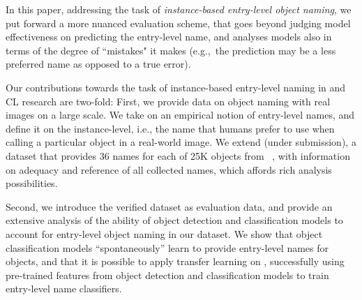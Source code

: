 In this paper, addressing the task of \textit{instance-based entry-level object naming}, we put forward a more nuanced evaluation scheme, that goes beyond judging model effectiveness on predicting the entry-level name, and analyses models also in terms of the degree of ``mistakes" it makes (e.g.,~the prediction may be a less preferred name as opposed to a true error).  

Our contributions towards the task of instance-based entry-level naming in \lv and CL research are two-fold:  
First, we provide data on object naming with real images on a large scale. 
We take on an empirical notion of entry-level names, and define it on the instance-level, i.e., the name that humans prefer to use when calling a particular object in a real-world image.   
We extend \mn (under submission), a dataset that provides 36 names for each of 25K objects from \vg~\cite{krishna2016visualgenome}, with information on adequacy and reference of all collected names, which affords rich analysis possibilities. 

Second, we introduce the verified \mn dataset as evaluation data, and provide an extensive analysis of the ability of object detection and classification models to account for entry-level object naming in our dataset. 
We show that object classification models ``spontaneously'' learn to provide entry-level names for objects, and that it is possible to apply transfer learning on \mn, successfully using pre-trained features from object detection and classification models to train entry-level name classifiers. 

\iffalse


%
%

